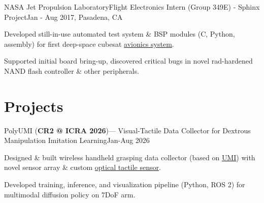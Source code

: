 \documentclass[letterpaper,10pt]{article}
\begin{document}
\begin{joblong}{NASA Jet Propulsion Laboratory}{Flight Electronics Intern (Group 349E) - Sphinx Project}{Jan - Aug 2017, Pasadena, CA}
\item Developed still-in-use automated test system \& BSP modules (C, Python, assembly) for first deep-space cubesat \href{https://digitalcommons.usu.edu/cgi/viewcontent.cgi?params=/context/smallsat/article/5263/&path_info=SSC22_VIII_03.pdf}{avionics system}.
\item Supported initial board bring-up, discovered critical bugs in novel rad-hardened NAND flash controller \& other peripherals.
\end{joblong}

\section{Projects}
\begin{jobshort}{PolyUMI (\textbf{CR2 @ ICRA 2026})--- Visual-Tactile Data Collector for Dextrous Manipulation Imitation Learning}{}{Jan-Aug 2026}
    \item Designed \& built wireless handheld grasping data collector (based on \href{https://umi-gripper.github.io}{UMI}) with novel sensor array \& custom \href{https://polytouch.alanz.info}{optical tactile sensor}.
    \item Developed training, inference, and visualization pipeline (Python, ROS 2) for multimodal diffusion policy on 7DoF arm.
\end{jobshort}
\end{document}
